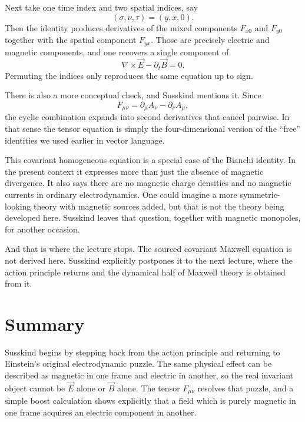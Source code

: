 Next take one time index and two spatial indices, say
\begin{equation}
(\sigma,\nu,\tau)=(y,x,0).
\end{equation}
Then the identity produces derivatives of the mixed components $F_{x0}$ and $F_{y0}$ together with the spatial component $F_{yx}$. Those are precisely electric and magnetic components, and one recovers a single component of
\begin{equation}
\nabla\times\vec E-\partial_t\vec B=0.
\end{equation}
Permuting the indices only reproduces the same equation up to sign.

There is also a more conceptual check, and Susskind mentions it. Since
\begin{equation}
F_{\mu\nu}=\partial_\mu A_\nu-\partial_\nu A_\mu,
\end{equation}
the cyclic combination expands into second derivatives that cancel pairwise. In that sense the tensor equation is simply the four-dimensional version of the ``free'' identities we used earlier in vector language.

This covariant homogeneous equation is a special case of the Bianchi identity. In the present context it expresses more than just the absence of magnetic divergence. It also says there are no magnetic charge densities and no magnetic currents in ordinary electrodynamics. One could imagine a more symmetric-looking theory with magnetic sources added, but that is not the theory being developed here. Susskind leaves that question, together with magnetic monopoles, for another occasion.

And that is where the lecture stops. The sourced covariant Maxwell equation is not derived here. Susskind explicitly postpones it to the next lecture, where the action principle returns and the dynamical half of Maxwell theory is obtained from it.

\section{Summary}

Susskind begins by stepping back from the action principle and returning to Einstein's original electrodynamic puzzle. The same physical effect can be described as magnetic in one frame and electric in another, so the real invariant object cannot be $\vec E$ alone or $\vec B$ alone. The tensor $F_{\mu\nu}$ resolves that puzzle, and a simple boost calculation shows explicitly that a field which is purely magnetic in one frame acquires an electric component in another.

